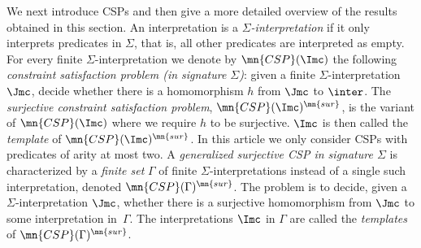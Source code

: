 \documentclass{lmcs}
\theoremstyle{definition}
\begin{document}
We next introduce CSPs and then give a more detailed overview of the
results obtained in this section. An interpretation \Imc is a
\emph{$\Sigma$-interpretation} if it only interprets predicates in
$\Sigma$, that is, all other predicates are interpreted as empty. For
every finite $\Sigma$-interpretation \Imc we denote by
$\mn{CSP}(\Imc)$ the following \emph{constraint satisfaction problem
  (in signature $\Sigma$)}: given a finite
$\Sigma$-interpretation~$\Jmc$, decide whether there is a homomorphism
$h$ from $\Jmc$ to $\inter$. The \emph{surjective constraint
  satisfaction problem}, $\mn{CSP}(\Imc)^{\mn{sur}}$, is the variant
of $\mn{CSP}(\Imc)$ where we require $h$ to be surjective. $\Imc$ is
then called the \emph{template} of $\mn{CSP}(\Imc)^{\mn{sur}}$. In
this article we only consider CSPs with predicates of arity at most two.
%
 A \emph{generalized
  surjective CSP in signature $\Sigma$} is characterized by a
\emph{finite set} $\Gamma$ of finite $\Sigma$-interpretations instead
of a single such interpretation, denoted
$\mn{CSP}(\Gamma)^{\mn{sur}}$. The problem is to decide, given a
$\Sigma$-interpretation $\Jmc$, whether there is a surjective
homomorphism from $\Jmc$ to some interpretation in~$\Gamma$. The
interpretations $\Imc$ in $\Gamma$ are called the \emph{templates} of
$\mn{CSP}(\Gamma)^{\mn{sur}}$. %
\end{document}
